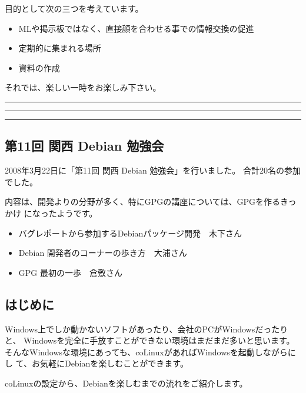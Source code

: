 \documentclass[mingoth,a4paper]{jsarticle}
\begin{document}
 目的として次の三つを考えています。
 \begin{itemize}
  \item MLや掲示板ではなく、直接顔を合わせる事での情報交換の促進
  \item 定期的に集まれる場所
  \item 資料の作成
 \end{itemize}

 それでは、楽しい一時をお楽しみ下さい。

\newpage

\begin{minipage}[b]{0.2\hsize}
 {}
\end{minipage}
\begin{minipage}[b]{0.8\hsize}
\hrule
\vspace{2mm}
\hrule
\setcounter{tocdepth}{1}
\tableofcontents
\vspace{2mm}
\hrule
\end{minipage}

\subsection{第11回 関西 Debian 勉強会}
2008年3月22日に「第11回 関西 Debian 勉強会」を行いました。
合計20名の参加でした。

内容は、開発よりの分野が多く、特にGPGの講座については、GPGを作るきっかけ
になったようです。

\begin{itemize}
 \item バグレポートから参加するDebianパッケージ開発　木下さん
 \item Debian 開発者のコーナーの歩き方　大浦さん
 \item GPG 最初の一歩　倉敷さん
\end{itemize}

\subsection{はじめに}
Windows上でしか動かないソフトがあったり、会社のPCがWindowsだったりと、
Windowsを完全に手放すことができない環境はまだまだ多いと思います。
そんなWindowsな環境にあっても、coLinuxがあればWindowsを起動しながらにし
て、お気軽にDebianを楽しむことができます。

coLinuxの設定から、Debianを楽しむまでの流れをご紹介します。
\end{document}
